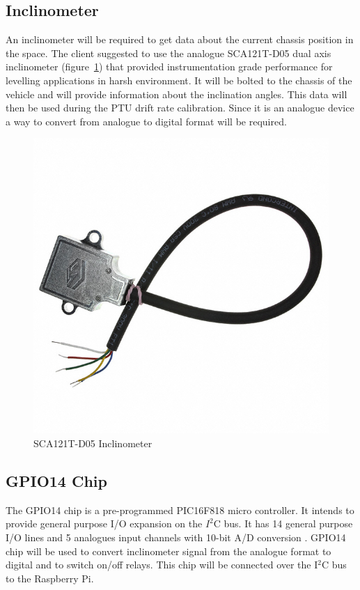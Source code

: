 \subsection{Inclinometer}
An inclinometer will be required to get data about the current chassis position in the space. The client suggested to use the analogue SCA121T-D05 dual axis inclinometer (figure~\ref{fig:SCA121T-D05_inclinometer}) that provided instrumentation grade performance for levelling applications in harsh environment. It will be bolted to the chassis of the vehicle and will provide information about the inclination angles. This data will then be used during the PTU drift rate calibration. Since it is an analogue device a way to convert from analogue to digital format will be required.

\begin{figure}[H]
\centering
\centerline{\includegraphics[scale=0.20]{./images/SCA121T}}
\caption{SCA121T-D05 Inclinometer}
\label{fig:SCA121T-D05_inclinometer}
\end{figure}

\subsection{GPIO14 Chip}
The GPIO14 chip is a pre-programmed PIC16F818 micro controller. It intends to provide general purpose I/O expansion on the $I^2$C bus. It has 14 general purpose I/O lines and 5 analogues input channels with 10-bit A/D conversion \cite{GPIO14}. GPIO14 chip will be used to convert inclinometer signal from the analogue format to digital and to switch on/off relays. This chip will be connected over the I$^2$C bus to the Raspberry Pi.

